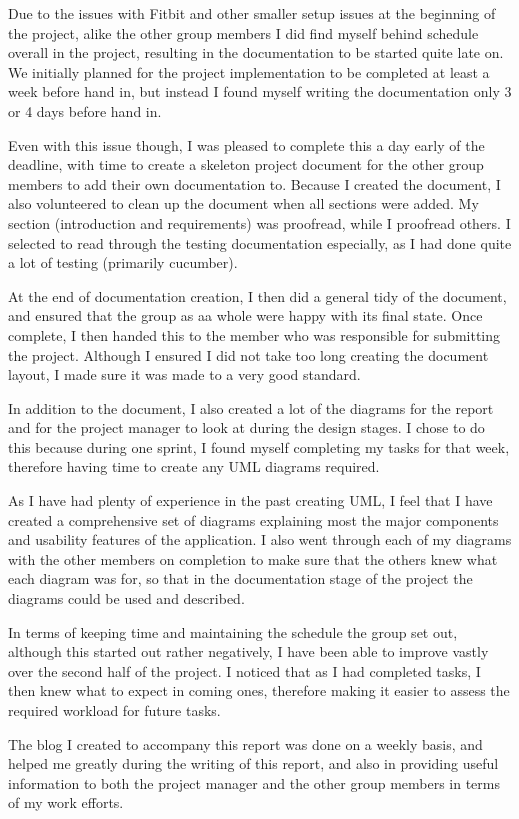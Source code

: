 Due to the issues with Fitbit and other smaller setup issues at the beginning of the project, alike the other group members I did find myself behind schedule overall in the project, resulting in the documentation to be started quite late on. We initially planned for the project implementation to be completed at least a week before hand in, but instead I found myself writing the documentation only 3 or 4 days before hand in. \par
Even with this issue though, I was pleased to complete this a day early of the deadline, with time to create a skeleton project document for the other group members to add their own documentation to. Because I created the document, I also volunteered to clean up the document when all sections were added. My section (introduction and requirements) was proofread, while I proofread others. I selected to read through the testing documentation especially, as I had done quite a lot of testing (primarily cucumber). \par
At the end of documentation creation, I then did a general tidy of the document, and ensured that the group as aa whole were happy with its final state. Once complete, I then handed this to the member who was responsible for submitting the project. Although I ensured I did not take too long creating the document layout, I made sure it was made to a very good standard. \par
In addition to the document, I also created a lot of the diagrams for the report and for the project manager to look at during the design stages. I chose to do this because during one sprint, I found myself completing my tasks for that week, therefore having time to create any UML diagrams required. \par
As I have had plenty of experience in the past creating UML, I feel that I have created a comprehensive set of diagrams explaining most the major components and usability features of the application. I also went through each of my diagrams with the other members on completion to make sure that the others knew what each diagram was for, so that in the documentation stage of the project the diagrams could be used and described. \par
In terms of keeping time and maintaining the schedule the group set out, although this started out rather negatively, I have been able to improve vastly over the second half of the project. I noticed that as I had completed tasks, I then knew what to expect in coming ones, therefore making it easier to assess the required workload for future tasks. \par
The blog I created to accompany this report was done on a weekly basis, and helped me greatly during the writing of this report, and also in providing useful information to both the project manager and the other group members in terms of my work efforts. 
